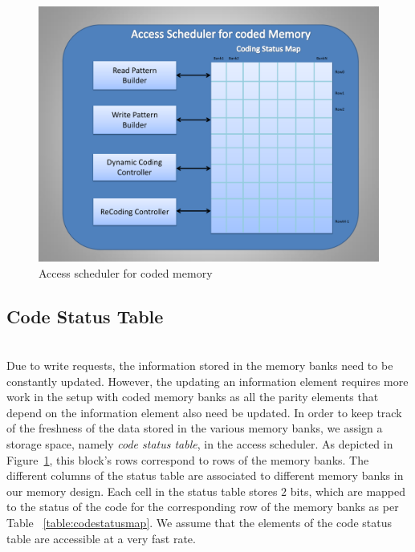 \begin{figure}[tbp]
\centering
\includegraphics[width=0.7\linewidth]{fig/coded_access_scheduler.pdf}
\caption{
{Access scheduler for coded memory} }
\label{fig:coded_access_scheduler}
\end{figure}
\subsection{Code Status Table}
\label{sec:codeStatusTable}
\\
Due to write requests, the information stored in the memory banks need to be constantly updated. However, the updating an information element requires more work in the setup with coded memory banks as all the parity elements that depend on the information element also need be updated. In order to keep track of the freshness of the data stored in the various memory banks, we assign a storage space, namely {\em code status table}, in the access scheduler. As depicted in Figure~\ref{fig:coded_access_scheduler}, this block's rows correspond to rows of the memory banks. The different columns of the status table are associated to different memory banks in our memory design.  Each cell in the status table stores $2$ bits, which are mapped to the status of the code for the corresponding row of the memory banks as per Table ~\ref{table:codestatusmap}. We assume that the elements of the code status table are accessible at a very fast rate. %


